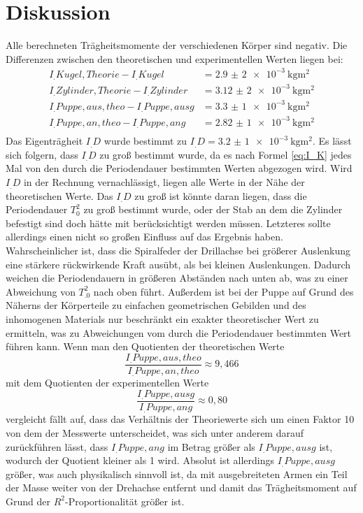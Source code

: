 \section{Diskussion}
\label{sec:Diskussion}
Alle berechneten Trägheitsmomente der verschiedenen Körper sind negativ.
Die Differenzen zwischen den theoretischen und experimentellen Werten liegen bei:
\begin{align*}
I_.{Kugel,Theorie}-I_.{Kugel}		&=\SI{2,9(2)e-3}{\kilo\gram\metre\squared}\\
I_.{Zylinder,Theorie}-I_.{Zylinder}	&=\SI{3,12(2)e-3}{\kilo\gram\metre\squared}\\
I_.{Puppe,aus,theo}-I_.{Puppe,ausg}	&=\SI{3,3(1)e-3}{\kilo\gram\metre\squared}\\
I_.{Puppe,an,theo}-I_.{Puppe,ang}	&=\SI{2,82(1)e-3}{\kilo\gram\metre\squared}\\
\end{align*}
Das Eigenträgheit $I_.D$ wurde bestimmt zu $I_.D=\SI{3,2(1)e-3}{\kilo\gram\metre\squared}$.
Es lässt sich folgern, dass $I_.D$ zu groß bestimmt wurde, da es nach Formel \eqref{eq:I_K} jedes Mal von den durch die Periodendauer bestimmten Werten abgezogen wird. Wird $I_.D$ in der Rechnung vernachlässigt, liegen alle Werte in der Nähe der theoretischen Werte.\newline
Das $I_.D$ zu groß ist könnte daran liegen, dass die Periodendauer $T_0^2$ zu groß bestimmt wurde, oder der Stab an dem die Zylinder befestigt sind doch hätte mit berücksichtigt werden müssen. Letzteres sollte allerdings einen nicht so großen Einfluss auf das Ergebnis haben. Wahrscheinlicher ist, dass die Spiralfeder der Drillachse bei größerer Auslenkung eine stärkere rückwirkende Kraft ausübt, als bei kleinen Auslenkungen. Dadurch weichen die Periodendauern in größeren Abständen nach unten ab, was zu einer Abweichung von $T_.0^2$ nach oben führt.\newline
Außerdem ist bei der Puppe auf Grund des Näherns der Körperteile zu einfachen geometrischen Gebilden und des inhomogenen Materials nur beschränkt ein exakter theoretischer Wert zu ermitteln, was zu Abweichungen vom durch die Periodendauer bestimmten Wert führen kann.
Wenn man den Quotienten der theoretischen Werte \[\frac{I_.{Puppe,aus,theo}}{I_.{Puppe,an,theo}}\approx 9,466\]
mit dem Quotienten der experimentellen Werte \[\frac{I_.{Puppe,ausg}}{I_.{Puppe,ang}}\approx 0,80\]
vergleicht fällt auf, dass das Verhältnis der Theoriewerte sich um einen Faktor 10 von dem der Messwerte unterscheidet, was sich unter anderem darauf zurückführen lässt, dass $I_.{Puppe,ang}$ im Betrag größer als $I_.{Puppe,ausg}$ ist, wodurch der Quotient kleiner als 1 wird. Absolut ist allerdings $I_.{Puppe,ausg}$ größer, was auch physikalisch sinnvoll ist, da mit ausgebreiteten Armen ein Teil der Masse weiter von der Drehachse entfernt und damit das Trägheitsmoment auf Grund der $R^2$-Proportionalität größer ist.
